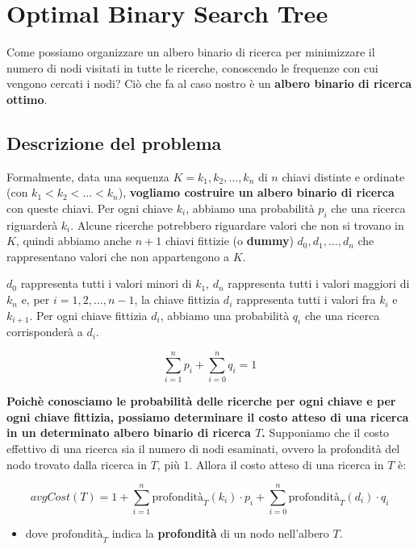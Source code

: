 \chapter{Optimal Binary Search Tree}

Come possiamo organizzare un albero binario di ricerca per minimizzare
il numero di nodi visitati in tutte le ricerche, conoscendo le frequenze
con cui vengono cercati i nodi? Ciò che fa al caso nostro è un
\textbf{albero binario di ricerca ottimo}.

\section{Descrizione del problema}

\begin{myblockquote}
  Formalmente, data una sequenza $K = k_1, k_2, ..., k_n$ di $n$
  chiavi distinte e ordinate (con $k_1 < k_2 < ... < k_n$),
  \textbf{vogliamo costruire un albero binario di ricerca} con queste
  chiavi. Per ogni chiave $k_i$, abbiamo una probabilità $p_i$ che una
  ricerca riguarderà $k_i$. Alcune ricerche potrebbero riguardare valori
  che non si trovano in $K$, quindi abbiamo anche $n+1$ chiavi
  fittizie (o \textbf{dummy}) $d_0, d_1, ..., d_n$ che rappresentano
  valori che non appartengono a $K$.
\end{myblockquote}

$d_0$ rappresenta tutti i valori minori di $k_1$, $d_n$
rappresenta tutti i valori maggiori di $k_n$ e, per
$i = 1, 2, ..., n-1$, la chiave fittizia $d_i$ rappresenta tutti i
valori fra $k_i$ e $k_{i+1}$. Per ogni chiave fittizia $d_i$,
abbiamo una probabilità $q_i$ che una ricerca corrisponderà a $d_i$.

$$
  \sum_{i=1}^{n} p_i +  \sum_{i=0}^{n} q_i = 1
$$

\textbf{Poichè conosciamo le probabilità delle ricerche per ogni chiave
  e per ogni chiave fittizia, possiamo determinare il costo atteso di una
  ricerca in un determinato albero binario di ricerca $T$.} Supponiamo
che il costo effettivo di una ricerca sia il numero di nodi esaminati,
ovvero la profondità del nodo trovato dalla ricerca in $T$, più 1.
Allora il costo atteso di una ricerca in $T$ è:

$$
  avgCost(T) = 1 + \sum_{i=1}^{n} \text{profondità}_T (k_i) \cdot p_i + \sum_{i = 0}^{n} \text{profondità}_T (d_i) \cdot q_i
$$


\begin{itemize}
    \item dove $\text{profondità}_T$ indica la \textbf{profondità} di un nodo
    nell'albero $T$.
\end{itemize}



